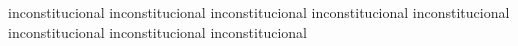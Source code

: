 \documentclass[12pt]{article}
\begin{document}
	\noindent\hrulefill\par
	inconstitucional inconstitucional inconstitucional inconstitucional
	inconstitucional inconstitucional inconstitucional inconstitucional
	
\end{document}
